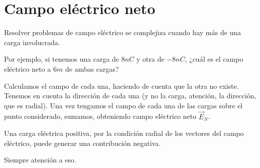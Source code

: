 \section{Campo eléctrico neto}

Resolver problemas de campo eléctrico se complejiza cuando hay más de una carga involucrada.

Por ejemplo, si tenemos una carga de \(8nC\) y otra de \(-8nC\),
¿cuál es el campo eléctrico neto a \(6m\) de ambas cargas?

Calculamos el campo de cada una,
haciendo de cuenta que la otra no existe.
Tenemos en cuenta la dirección de cada una
(y no la carga, atención, la dirección, que es radial).
Una vez tengamos el campo de cada una de las cargas sobre el punto considerado,
sumamos,
obteniendo campo eléctrico neto \(\vec{E}_N\).

Una carga eléctrica positiva,
por la condición radial de los vectores del campo eléctrico,
puede generar una contribución negativa.

Siempre atención a eso.